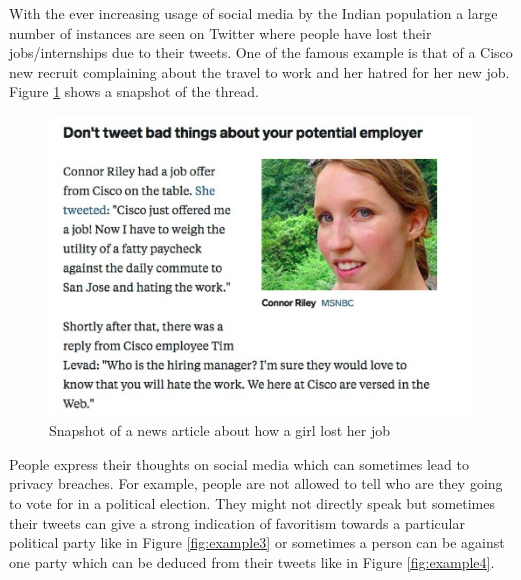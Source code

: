 \documentclass[a4paper,11pt]{article}
\begin{document}
\newpage
With the ever increasing usage of social media by the Indian population a large number of instances are seen on Twitter where people have lost their jobs/internships due to their tweets. One of the famous example is that of a Cisco new recruit complaining about the travel to work and her hatred for her new job. Figure \ref{fig:example2} shows a snapshot of the thread.\medskip\\
\begin{figure}[h]
  \includegraphics[width=\linewidth]{CiscoTweet.png}
  \caption{Snapshot of a news article about how a girl lost her job}
  \label{fig:example2}
\end{figure}
People express their thoughts on social media which can sometimes lead to privacy breaches. For example, people are not allowed to tell who are they going to vote for in a political election. They might not directly speak but sometimes their tweets can give a strong indication of favoritism towards a particular political party like in Figure \ref{fig:example3} or sometimes a person can be against one party which can be deduced from their tweets like in Figure \ref{fig:example4}.\medskip\\
\end{document}

